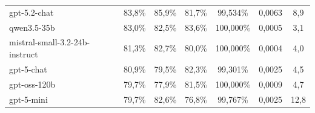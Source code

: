 \documentclass{IEEEphot}
\begin{document}
\begin{table}[t]
\begin{tabular}{|l|c|c|c|c|c|c|}
gpt-5.2-chat                                                                                              & 83,8\%                                                              & 85,9\%        & 81,7\%           & 99,534\%                                                           & 0,0063                                                              & 8,9                                                                   \\
qwen3.5-35b                                                                                               & 83,0\%                                                              & 82,5\%        & 83,6\%           & 100,000\%                                                          & 0,0005                                                              & 3,1                                                                   \\
mistral-small-3.2-24b-instruct                                                                            & 81,3\%                                                              & 82,7\%        & 80,0\%           & 100,000\%                                                          & 0,0004                                                              & 4,0                                                                   \\
gpt-5-chat                                                                                                & 80,9\%                                                              & 79,5\%        & 82,3\%           & 99,301\%                                                           & 0,0025                                                              & 4,5                                                                   \\
gpt-oss-120b                                                                                              & 79,7\%                                                              & 77,9\%        & 81,5\%           & 100,000\%                                                          & 0,0009                                                              & 4,7                                                                   \\
gpt-5-mini                                                                                                & 79,7\%                                                              & 82,6\%        & 76,8\%           & 99,767\%                                                           & 0,0025                                                              & 12,8                                                                  \\

\end{tabular}
\end{table}
\end{document}
